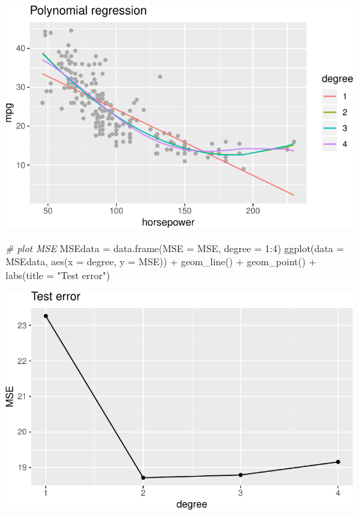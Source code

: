 \documentclass[
]{article}
\newenvironment{Shaded}{\begin{snugshade}}{\end{snugshade}}
\newcommand{\AttributeTok}[1]{\textcolor[rgb]{0.77,0.63,0.00}{#1}}
\newcommand{\CommentTok}[1]{\textcolor[rgb]{0.56,0.35,0.01}{\textit{#1}}}
\newcommand{\DecValTok}[1]{\textcolor[rgb]{0.00,0.00,0.81}{#1}}
\newcommand{\FunctionTok}[1]{\textcolor[rgb]{0.00,0.00,0.00}{#1}}
\newcommand{\NormalTok}[1]{#1}
\newcommand{\OtherTok}[1]{\textcolor[rgb]{0.56,0.35,0.01}{#1}}
\newcommand{\SpecialCharTok}[1]{\textcolor[rgb]{0.00,0.00,0.00}{#1}}
\newcommand{\StringTok}[1]{\textcolor[rgb]{0.31,0.60,0.02}{#1}}
\begin{document}
\includegraphics{RecEx7-sol_files/figure-latex/unnamed-chunk-2-2.pdf}

\begin{Shaded}
\begin{Highlighting}[]
\CommentTok{\# plot MSE}
\NormalTok{MSEdata }\OtherTok{=} \FunctionTok{data.frame}\NormalTok{(}\AttributeTok{MSE =}\NormalTok{ MSE, }\AttributeTok{degree =} \DecValTok{1}\SpecialCharTok{:}\DecValTok{4}\NormalTok{)}
\FunctionTok{ggplot}\NormalTok{(}\AttributeTok{data =}\NormalTok{ MSEdata, }\FunctionTok{aes}\NormalTok{(}\AttributeTok{x =}\NormalTok{ degree, }\AttributeTok{y =}\NormalTok{ MSE)) }\SpecialCharTok{+} \FunctionTok{geom\_line}\NormalTok{() }\SpecialCharTok{+} \FunctionTok{geom\_point}\NormalTok{() }\SpecialCharTok{+} \FunctionTok{labs}\NormalTok{(}\AttributeTok{title =} \StringTok{"Test error"}\NormalTok{)}
\end{Highlighting}
\end{Shaded}

\includegraphics{RecEx7-sol_files/figure-latex/unnamed-chunk-2-3.pdf}
\end{document}
